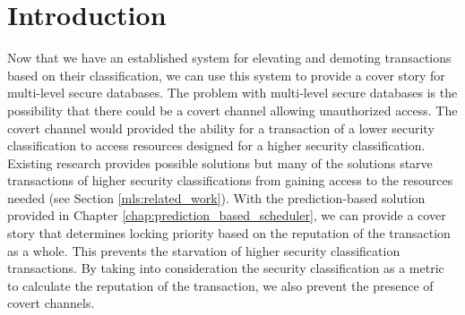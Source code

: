 \section{Introduction}
\label{mls:introduction}
Now that we have an established system for elevating and demoting transactions based on their classification, we can use this system to provide a cover story for multi-level secure databases. The problem with multi-level secure databases is the possibility that there could be a covert channel allowing unauthorized access. The covert channel would provided the ability for a transaction of a lower security classification to access resources designed for a higher security classification. Existing research provides possible solutions but many of the solutions starve transactions of higher security classifications from gaining access to the resources needed (see Section \ref{mls:related_work}). With the prediction-based solution provided in Chapter \ref{chap:prediction_based_scheduler}, we can provide a cover story that determines locking priority based on the reputation of the transaction as a whole. This prevents the starvation of higher security classification transactions. By taking into consideration the security classification as a metric to calculate the reputation of the transaction, we also prevent the presence of covert channels. 